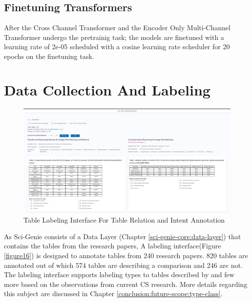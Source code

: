 \subsection{Finetuning Transformers}
After the Cross Channel Transformer and the Encoder Only Multi-Channel Transformer undergo the pretrainig task; the models are finetuned with a learning rate of 2e-05 scheduled with a cosine learning rate scheduler for 20 epochs on the finetuning task.

\section{Data Collection And Labeling}
\label{table_classification:data-coll}

\begin{figure}[h]
    \centering
    \includegraphics[width=\maxwidth{\textwidth}]{src/images/table-lable-exp.pdf}
    \caption{Table Labeling Interface For Table Relation and Intent Annotation}
    \label{figure\arabic{figurecounter}}
\end{figure}

As Sci-Genie consists of a Data Layer (Chapter \ref{sci-genie-core:data-layer}) that contains the tables from the research papers, A labeling interface(Figure \ref{figure16}) is designed to annotate tables from 240 research papers. 820 tables are annotated out of which 574 tables are describing a comparison and 246 are not. The labeling interface supports labeling types to tables described by \cite{kim2012scientific} and few more based on the observations from current CS research. More details regarding this subject are discussed in Chapter \ref{conclusion:future-scope:type-class}. 

